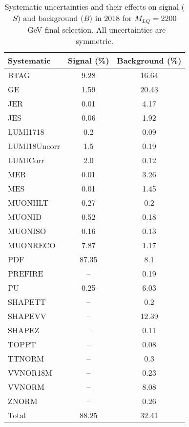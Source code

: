 \begin{table}[htbp]
\begin{center}
\caption{Systematic uncertainties and their effects on signal ($S$) and background ($B$) in 2018 for $M_{LQ}=2200$~GeV final selection. All uncertainties are symmetric.}
\begin{tabular}{lcc}
\hline\hline
Systematic & Signal (\%) & Background (\%) \\ \hline 
BTAG & 9.28 & 16.64\\ 
GE & 1.59 & 20.43\\ 
JER & 0.01 & 4.17\\ 
JES & 0.06 & 1.92\\ 
LUMI1718 & 0.2 & 0.09\\ 
LUMI18Uncorr & 1.5 & 0.19\\ 
LUMICorr & 2.0 & 0.12\\ 
MER & 0.01 & 3.26\\ 
MES & 0.01 & 1.45\\ 
MUONHLT & 0.27 & 0.2\\ 
MUONID & 0.52 & 0.18\\ 
MUONISO & 0.16 & 0.13\\ 
MUONRECO & 7.87 & 1.17\\ 
PDF & 87.35 & 8.1\\ 
PREFIRE & -- & 0.19\\ 
PU & 0.25 & 6.03\\ 
SHAPETT & -- & 0.2\\ 
SHAPEVV & -- & 12.39\\ 
SHAPEZ & -- & 0.11\\ 
TOPPT & -- & 0.08\\ 
TTNORM & -- & 0.3\\ 
VVNOR18M & -- & 0.23\\ 
VVNORM & -- & 8.08\\ 
ZNORM & -- & 0.26\\ 
Total & 88.25 & 32.41\\ \hline \hline
\end{tabular}
\label{tab:SysUncertainties_uujj_2200}
\end{center}
\end{table}

